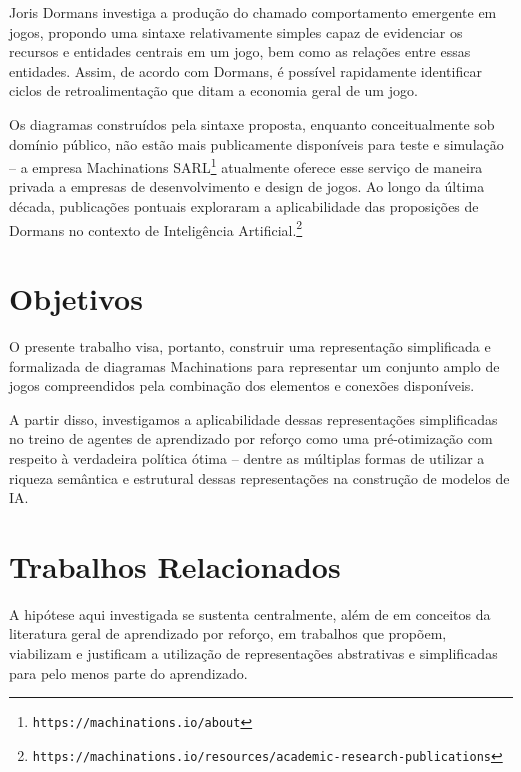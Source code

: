\documentclass[conference]{IEEEtran}
\begin{document}
Joris Dormans\cite{machinations} investiga a produção do chamado comportamento emergente em jogos, propondo uma sintaxe relativamente simples capaz de evidenciar os recursos e entidades centrais em um jogo, bem como as relações entre essas entidades. Assim, de acordo com Dormans, é possível rapidamente identificar ciclos de retroalimentação que ditam a economia geral de um jogo.

Os diagramas construídos pela sintaxe proposta, enquanto conceitualmente sob domínio público, não estão mais publicamente disponíveis para teste e simulação -- a empresa Machinations SARL\footnote{\texttt{https://machinations.io/about}} atualmente oferece esse serviço de maneira privada a empresas de desenvolvimento e design de jogos. Ao longo da última década, publicações pontuais exploraram a aplicabilidade das proposições de Dormans no contexto de Inteligência Artificial.\footnote{\texttt{https://machinations.io/resources/academic-research-publications}}


\section{Objetivos}
\label{goals}

O presente trabalho visa, portanto, construir uma representação simplificada e formalizada de diagramas  Machinations para representar um conjunto amplo de jogos compreendidos pela combinação dos elementos e conexões disponíveis. 

A partir disso, investigamos a aplicabilidade dessas representações simplificadas no treino de agentes de aprendizado por reforço como uma pré-otimização com respeito à verdadeira política ótima -- dentre as múltiplas formas de utilizar a riqueza semântica e estrutural dessas representações na construção de modelos de IA.

\section{Trabalhos Relacionados}
A hipótese aqui investigada se sustenta centralmente, além de em conceitos da literatura geral de aprendizado por reforço, em trabalhos que propõem, viabilizam e justificam a utilização de representações abstrativas e simplificadas para pelo menos parte do aprendizado.
\end{document}
